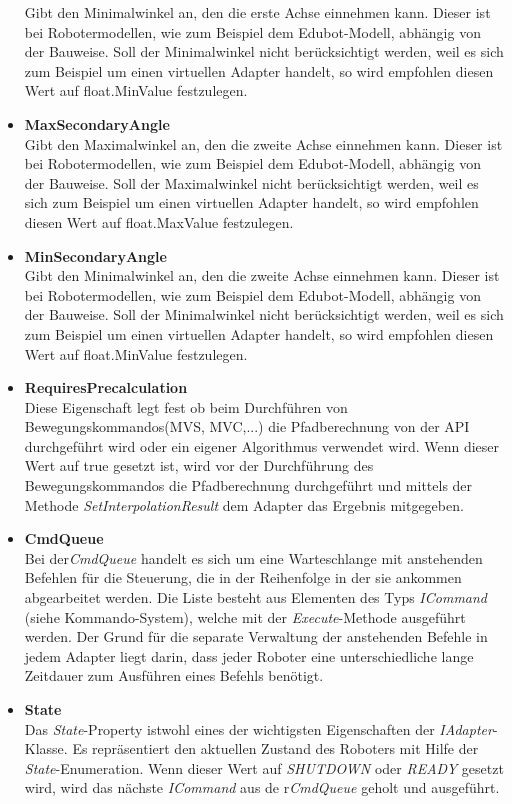 \begin{itemize}
Gibt den Minimalwinkel an, den die erste Achse einnehmen kann. Dieser ist bei Robotermodellen, wie zum Beispiel dem Edubot-Modell, abhängig von der Bauweise. Soll der Minimalwinkel nicht berücksichtigt werden, weil es sich zum Beispiel um einen virtuellen Adapter handelt, so wird empfohlen diesen Wert auf float.MinValue festzulegen.
\item \textbf{MaxSecondaryAngle}\\
Gibt den Maximalwinkel an, den die zweite Achse einnehmen kann. Dieser ist bei Robotermodellen, wie zum Beispiel dem Edubot-Modell, abhängig von der Bauweise. Soll der Maximalwinkel nicht berücksichtigt werden, weil es sich zum Beispiel um einen virtuellen Adapter handelt, so wird empfohlen diesen Wert auf float.MaxValue festzulegen.
\item \textbf{MinSecondaryAngle}\\
Gibt den Minimalwinkel an, den die zweite Achse einnehmen kann. Dieser ist bei Robotermodellen, wie zum Beispiel dem Edubot-Modell, abhängig von der Bauweise. Soll der Minimalwinkel nicht berücksichtigt werden, weil es sich zum Beispiel um einen virtuellen Adapter handelt, so wird empfohlen diesen Wert auf float.MinValue festzulegen.
\item \textbf{RequiresPrecalculation}\\
Diese Eigenschaft legt fest ob beim Durchführen von Bewegungskommandos(MVS, MVC,...) die Pfadberechnung von der API durchgeführt wird oder ein eigener Algorithmus verwendet wird. Wenn dieser Wert auf true gesetzt ist, wird vor der Durchführung des Bewegungskommandos die Pfadberechnung durchgeführt und mittels der Methode \textit{SetInterpolationResult} dem Adapter das Ergebnis mitgegeben.
\item \textbf{CmdQueue}\\
Bei der\textit{CmdQueue} handelt es sich um eine Warteschlange mit anstehenden Befehlen für die Steuerung, die in der Reihenfolge in der sie ankommen abgearbeitet werden. Die Liste besteht aus Elementen des Typs \textit{ICommand} (siehe Kommando-System), welche mit der \textit{Execute}-Methode ausgeführt werden.
Der Grund für die separate Verwaltung der anstehenden Befehle in jedem Adapter liegt darin, dass jeder Roboter eine unterschiedliche lange Zeitdauer zum Ausführen eines Befehls benötigt.
\item \textbf{State}\\
Das \textit{State}-Property istwohl eines der wichtigsten Eigenschaften der \textit{IAdapter}-Klasse. Es repräsentiert den aktuellen Zustand des Roboters mit Hilfe der \textit{State}-Enumeration. Wenn dieser Wert auf \textit{SHUTDOWN} oder  \textit{READY} gesetzt wird, wird das nächste \textit{ICommand} aus de r\textit{CmdQueue} geholt und ausgeführt.
\end{itemize}

